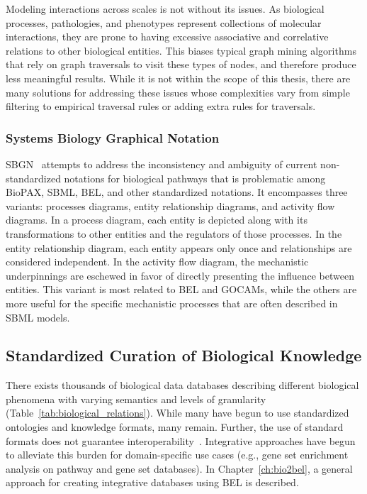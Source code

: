Modeling interactions across scales is not without its issues.
As biological processes, pathologies, and phenotypes represent collections of molecular interactions, they are prone to having excessive associative and correlative relations to other biological entities.
This biases typical graph mining algorithms that rely on graph traversals to visit these types of nodes, and therefore produce less meaningful results.
While it is not within the scope of this thesis, there are many solutions for addressing these issues whose complexities vary from simple filtering to empirical traversal rules or adding extra rules for traversals.

\subsubsection{Systems Biology Graphical Notation}

\ac{SBGN}~\cite{LeNovere2009} attempts to address the inconsistency and ambiguity of current non-standardized notations for biological pathways that is problematic among \ac{BioPAX}, \ac{SBML}, \ac{BEL}, and other standardized notations.
It encompasses three variants: processes diagrams, entity relationship diagrams, and activity flow diagrams.
In a process diagram, each entity is depicted along with its transformations to other entities and the regulators of those processes.
In the entity relationship diagram, each entity appears only once and relationships are considered independent.
In the activity flow diagram, the mechanistic underpinnings are eschewed in favor of directly presenting the influence between entities.
This variant is most related to \ac{BEL} and \acp{GOCAM}, while the others are more useful for the specific mechanistic processes that are often described in \ac{SBML} models.

\subsection{Standardized Curation of Biological Knowledge}
\label{subsec:standardized_curation}

There exists thousands of biological data databases describing different biological phenomena with varying semantics and levels of granularity (Table~\ref{tab:biological_relations}).
While many have begun to use standardized ontologies and knowledge formats, many remain.
Further, the use of standard formats does not guarantee interoperability~\cite{Domingo-Fernandez2019a}.
Integrative approaches have begun to alleviate this burden for domain-specific use cases (e.g., gene set enrichment analysis on pathway and gene set databases).
In Chapter~\autoref{ch:bio2bel}, a general approach for creating integrative databases using BEL is described.

